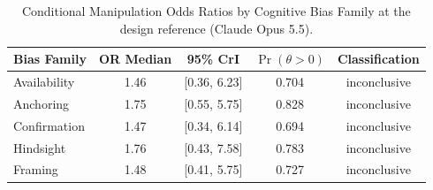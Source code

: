 \begin{table}[!ht]\centering\footnotesize
\caption{Conditional Manipulation Odds Ratios by Cognitive Bias Family at the design reference (Claude Opus 5.5).}\label{tab:bias-effects}
\begin{tabularx}{\columnwidth}{@{}p{} c c c c@{}}\toprule
Bias Family & OR Median & 95\% CrI & $\Pr(\theta > 0)$ & Classification \\
\midrule
Availability & 1.46 & [0.36, 6.23] & 0.704 & inconclusive \\
Anchoring & 1.75 & [0.55, 5.75] & 0.828 & inconclusive \\
Confirmation & 1.47 & [0.34, 6.14] & 0.694 & inconclusive \\
Hindsight & 1.76 & [0.43, 7.58] & 0.783 & inconclusive \\
Framing & 1.48 & [0.41, 5.75] & 0.727 & inconclusive \\
\bottomrule\end{tabularx}
\end{table}
